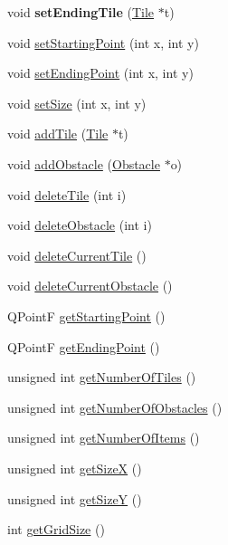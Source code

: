 \begin{DoxyCompactItemize}
void {\bfseries set\+Ending\+Tile} (\mbox{\hyperlink{class_tile}{Tile}} $\ast$t)
\item 
void \mbox{\hyperlink{class_map_ab4fe2e5f95e7fd16f028a0ffe1db8917}{set\+Starting\+Point}} (int x, int y)
\item 
void \mbox{\hyperlink{class_map_aedbdf210bf5ec2b87fa834e8e20b16dd}{set\+Ending\+Point}} (int x, int y)
\item 
void \mbox{\hyperlink{class_map_a483c836df20db96ba2f7118f7b3c2dfd}{set\+Size}} (int x, int y)
\item 
void \mbox{\hyperlink{class_map_a2727714e173313a9b2738b34deb78fb7}{add\+Tile}} (\mbox{\hyperlink{class_tile}{Tile}} $\ast$t)
\item 
void \mbox{\hyperlink{class_map_adf099f25e89a3470a348ccf87bc4a55d}{add\+Obstacle}} (\mbox{\hyperlink{class_obstacle}{Obstacle}} $\ast$o)
\item 
void \mbox{\hyperlink{class_map_aa220ee8afb6eb77ae41d137d44919173}{delete\+Tile}} (int i)
\item 
void \mbox{\hyperlink{class_map_aaad5b40b9c748b23da1cb3420e0c86de}{delete\+Obstacle}} (int i)
\item 
void \mbox{\hyperlink{class_map_a89bab8e9b24c94b2696d624dac43cffa}{delete\+Current\+Tile}} ()
\item 
void \mbox{\hyperlink{class_map_ac29cdcf87495d5335655ab55f890a57e}{delete\+Current\+Obstacle}} ()
\item 
Q\+PointF \mbox{\hyperlink{class_map_a378b0d0c136bd92b080d206f3bc2cd00}{get\+Starting\+Point}} ()
\item 
Q\+PointF \mbox{\hyperlink{class_map_a89f8852e818ad3c4ff7ff3ff9434e544}{get\+Ending\+Point}} ()
\item 
unsigned int \mbox{\hyperlink{class_map_ae993424a64bb5638db33127d2a450014}{get\+Number\+Of\+Tiles}} ()
\item 
unsigned int \mbox{\hyperlink{class_map_a2314b59099da9d9fdd16e9f816150709}{get\+Number\+Of\+Obstacles}} ()
\item 
unsigned int \mbox{\hyperlink{class_map_af960a5f3d085679f49fc56b0cc0ffdaf}{get\+Number\+Of\+Items}} ()
\item 
unsigned int \mbox{\hyperlink{class_map_a295543a6b7ade2cdffd2faba2adda417}{get\+SizeX}} ()
\item 
unsigned int \mbox{\hyperlink{class_map_a07c437bb06a96676d6a732a559d3df4f}{get\+SizeY}} ()
\item 
int \mbox{\hyperlink{class_map_aced3d71b8481cf37e218ff4ddb987874}{get\+Grid\+Size}} ()
\item 

\end{DoxyCompactItemize}

